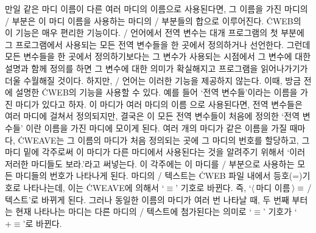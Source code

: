 만일 같은 마디 이름이 다른 여러 마디의 이름으로 사용된다면, 그 이름을 가진 마디의
\CEE/ 부분은 이 마디 이름을 사용하는 마디의 \CEE/ 부분들의 합으로 이루어진다. \.{CWEB}의
이 기능은 매우 편리한 기능이다. \CEE/ 언어에서 전역 변수는 대개 프로그램의 첫 부분에 그
프로그램에서 사용되는 모든 전역 변수들을 한 곳에서 정의하거나 선언한다. 그런데 모든 변수들을
한 곳에서 정의하기보다는 그 변수가 사용되는 시점에서 그 변수에 대한 설명과 함께 정의를 하면
그 변수에 대한 의미가 확실해지고 프로그램을 읽어나가기가 더울 수월해질 것이다. 하지만, \CEE/
언어는 이러한 기능을 제공하지 않는다. 이때, 방금 전에 설명한 \.{CWEB}의 기능을 사용할 수
있다. 예를 들어 `전역 변수들'이라는 이름을 가진 마디가 있다고 하자. 이 마디가 여러 마디의 이름
으로 사용된다면, 전역 변수들은 여러 마디에 걸쳐서 정의되지만, 결국은 이 모든 전역 변수들이
처음에 정의한 `전역 변수들' 이란 이름을 가진 마디에 모이게 된다. 여러 개의 마디가 같은 이름을
가질 때마다, \.{CWEAVE}는 그 이름의 마디가 처음 정의되는 곳에 그 마디의 번호를 할당하고,
그 마디 밑에 각주로써 이 마디가 다른 마디에서 사용된다는 것을 알려주기 위해서
`이러저러한 마디들도 보라.'라고 써넣는다. 이 각주에는 이 마디를 \CEE/ 부분으로
사용하는 모든 마디들의 번호가 나타나게 된다. 마디의 \CEE/ 텍스트는 \.{CWEB} 파일 내에서
등호(=)기호로 나타나는데, 이는 \.{CWEAVE}에 의해서 `$\equiv$' 기호로 바뀐다.
즉, `$\langle\,$마디 이름$\,\rangle\equiv\null$\CEE/ 텍스트'로 바뀌게 된다.
그러나 동일한 이름의 마디가 여러 번 나타날 때, 두 번째 부터는 현재 나타나는 마디는
다른 마디의 \CEE/ 텍스트에 첨가된다는 의미로 `$\equiv$' 기호가 `$\mathrel+\equiv$'로
바뀐다.

